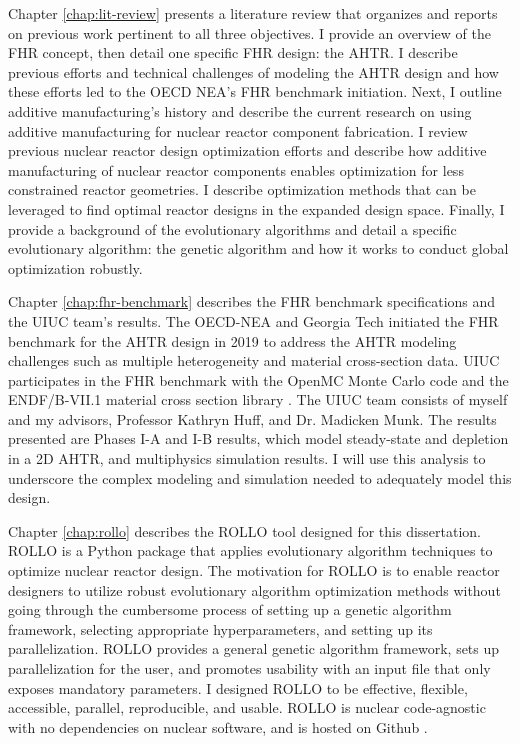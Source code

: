 Chapter \ref{chap:lit-review} presents a literature review that organizes and 
reports on previous work pertinent to all three objectives. 
I provide an overview of the \gls{FHR} concept, then detail one specific 
\gls{FHR} design: the \gls{AHTR}. 
I describe previous efforts and technical challenges of modeling the \gls{AHTR} design
and how these efforts led to the \gls{OECD} \gls{NEA}'s \gls{FHR} benchmark initiation.
Next, I outline additive manufacturing's history and describe the current 
research on using additive manufacturing for nuclear reactor component fabrication. 
I review previous nuclear reactor design optimization efforts and describe how 
additive manufacturing of nuclear reactor components enables optimization for 
less constrained reactor geometries. 
I describe optimization methods that can be leveraged to find optimal reactor 
designs in the expanded design space.
Finally, I provide a background of the evolutionary algorithms and detail a specific 
evolutionary algorithm: the genetic algorithm and how it works to conduct global 
optimization robustly.

Chapter \ref{chap:fhr-benchmark} describes the \gls{FHR} benchmark specifications and 
the \gls{UIUC} team's results.
The \gls{OECD}-\gls{NEA} and \gls{Georgia Tech} initiated the \gls{FHR} 
benchmark for the \gls{AHTR} design in 2019 \cite{petrovic_benchmark_2021} 
to address the \gls{AHTR} modeling challenges such as multiple heterogeneity and 
material cross-section data. 
\gls{UIUC} participates in the \gls{FHR} benchmark with the OpenMC Monte Carlo code 
\cite{romano_openmc_2013} and the ENDF/B-VII.1 material cross section library 
\cite{chadwick_endf/b-vii.1_2011}.
The \gls{UIUC} team consists of myself and my advisors, Professor Kathryn Huff, 
and Dr. Madicken Munk. 
The results presented are Phases I-A and I-B results, which model steady-state and 
depletion in a 2D \gls{AHTR}, and multiphysics simulation results. 
I will use this analysis to underscore the complex modeling and simulation needed to 
adequately model this design. 

Chapter \ref{chap:rollo} describes the \acrfull{ROLLO} tool designed for this 
dissertation. 
\gls{ROLLO} is a Python package that applies evolutionary algorithm 
techniques to optimize nuclear reactor design. 
The motivation for \gls{ROLLO} is to enable reactor designers to utilize 
robust evolutionary algorithm optimization methods without going 
through the cumbersome process of setting up a genetic algorithm framework,
selecting appropriate hyperparameters, and setting up its parallelization. 
\gls{ROLLO} provides a general genetic algorithm framework, sets up 
parallelization for the user, and promotes usability with an input file 
that only exposes mandatory parameters.
I designed  \gls{ROLLO} to be effective, flexible, accessible, parallel, 
reproducible, and usable. 
\gls{ROLLO} is nuclear code-agnostic with no dependencies on  
nuclear software, and is hosted on Github \cite{chee_rollo_2021}. 

